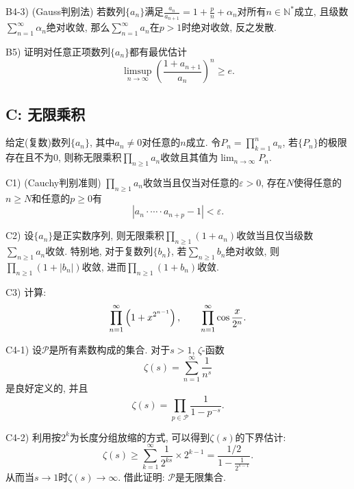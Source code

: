 B4-3) (Gauss判别法) 若数列$\{ a_n \}$满足$\frac{a_n}{a_{n+1}}=1+\frac{p}{n} +\alpha _n$对所有$n \in \mathbb{N}^*$成立, 且级数$\sum_{n=1}^{\infty} \alpha _n$绝对收敛, 那么$\sum_{n=1}^{\infty} a_n$在$p>1$时绝对收敛, 反之发散. 
\vspace{1em}

B5) 证明对任意正项数列$\{ a_n \}$都有最优估计$$\limsup_{n\to \infty} \left(\frac{1+a_{n+1}}{a_n} \right)^n \geq e.$$


\subsection*{C: 无限乘积}

给定(复数)数列$\{ a_n \}$, 其中$a_n \neq 0$对任意的$n$成立. 令$P_n = \prod_{k=1}^{n} a_n$, 若$\{ P_n \}$的极限存在且不为$0$, 则称无限乘积$\prod_{n \geq 1}a_n$收敛且其值为$\lim_{n \to \infty} P_n$. 
\vspace{1em}

C1) (Cauchy判别准则) $\prod_{n \geq 1}a_n$收敛当且仅当对任意的$\varepsilon >0$, 存在$N$使得任意的$n \geq N$和任意的$p \geq 0$有$$|a_n \cdot \cdots \cdot a_{n+p}-1|<\varepsilon .$$

C2) 设$\{ a_n \}$是正实数序列, 则无限乘积$\prod_{n \geq 1} (1+a_n)$收敛当且仅当级数$\sum_{n\geq 1}a_n$收敛. 特别地, 对于复数列$\{ b_n \}$, 若$\sum_{n\geq 1}b_n$绝对收敛, 则$\prod_{n \geq 1} (1+|b_n|)$收敛, 进而$\prod_{n \geq 1} (1+b_n)$收敛. 
\vspace{1em}

C3) 计算: $$\prod_{n=1}^{\infty} \left( 1+x^{2^{n-1}} \right),\qquad \prod_{n=1}^{\infty} \cos \frac{x}{2^n}.$$

C4-1) 设$\mathcal{P}$是所有素数构成的集合. 对于$s>1$, $\zeta$-函数$$\zeta (s) = \sum_{n=1}^{\infty} \frac{1}{n^s}$$
是良好定义的, 并且$$\zeta (s) = \prod_{p \in \mathcal{P}} \frac{1}{1-p^{-s}}. $$

C4-2) 利用按$2^k$为长度分组放缩的方式, 可以得到$\zeta (s)$的下界估计: $$\zeta (s) \geq \sum_{k=1}^{\infty} \frac{1}{2^{ks}} \times 2^{k-1} = \frac{1/2}{1-\frac{1}{2^{s-1}}}.$$
从而当$s \to 1$时$\zeta (s) \to \infty$. 借此证明: $\mathcal{P}$是无限集合. 


















